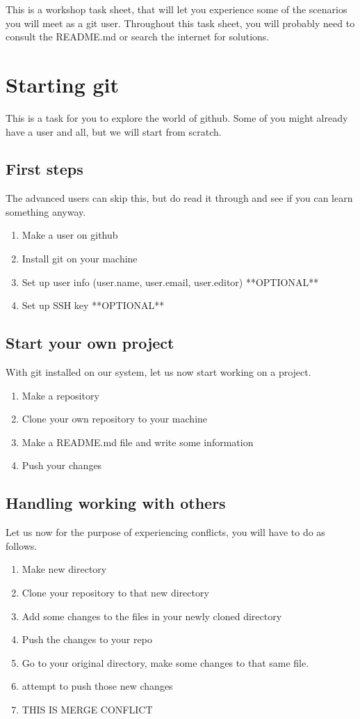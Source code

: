 \documentclass[12 pt,a4paper]{article}
\newcommand{\Fin}{
\vfill
\begin{center}
\textit{ }\label{FIN}
\end{center}}
\begin{document}
\noindent This is a workshop task sheet, 
that will let you experience some of the scenarios you will meet as a git user.
Throughout this task sheet,
you will probably need to consult the README.md or search the internet for solutions.

\section*{Starting git}
This is a task for you to explore the world of github.
Some of you might already have a user and all, 
but we will start from scratch.

\subsection*{First steps}
The advanced users can skip this,
but do read it through and see if you can learn something anyway.
\begin{enumerate}
  \item Make a user on github
  \item Install git on your machine
  \item Set up user info (user.name, user.email, user.editor) **OPTIONAL**
  \item Set up SSH key **OPTIONAL**
\end{enumerate}

\subsection*{Start your own project}
With git installed on our system, let us now start working on a project.
\begin{enumerate}
\item Make a repository
\item Clone your own repository to your machine
\item Make a README.md file and write some information
\item Push your changes
\end{enumerate}

\subsection*{Handling working with others}
Let us now for the purpose of experiencing conflicts, you will have to do as follows.

\begin{enumerate}
\item Make new directory
\item Clone your repository to that new directory
\item Add some changes to the files in your newly cloned directory
\item Push the changes to your repo
\item Go to your original directory, make some changes to that same file.
\item attempt to push those new changes
\item THIS IS MERGE CONFLICT 

\end{enumerate}

\Fin
\end{document}
